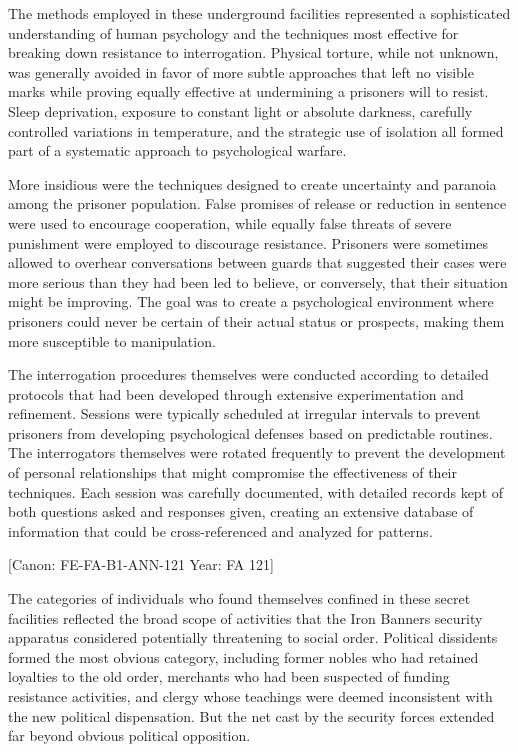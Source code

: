 The methods employed in these underground facilities represented a
sophisticated understanding of human psychology and the techniques most
effective for breaking down resistance to interrogation. Physical
torture, while not unknown, was generally avoided in favor of more
subtle approaches that left no visible marks while proving equally
effective at undermining a prisoner\textquotesingle s will to resist.
Sleep deprivation, exposure to constant light or absolute darkness,
carefully controlled variations in temperature, and the strategic use of
isolation all formed part of a systematic approach to psychological
warfare.

More insidious were the techniques designed to create uncertainty and
paranoia among the prisoner population. False promises of release or
reduction in sentence were used to encourage cooperation, while equally
false threats of severe punishment were employed to discourage
resistance. Prisoners were sometimes allowed to overhear conversations
between guards that suggested their cases were more serious than they
had been led to believe, or conversely, that their situation might be
improving. The goal was to create a psychological environment where
prisoners could never be certain of their actual status or prospects,
making them more susceptible to manipulation.

The interrogation procedures themselves were conducted according to
detailed protocols that had been developed through extensive
experimentation and refinement. Sessions were typically scheduled at
irregular intervals to prevent prisoners from developing psychological
defenses based on predictable routines. The interrogators themselves
were rotated frequently to prevent the development of personal
relationships that might compromise the effectiveness of their
techniques. Each session was carefully documented, with detailed records
kept of both questions asked and responses given, creating an extensive
database of information that could be cross-referenced and analyzed for
patterns.

{[}Canon: FE-FA-B1-ANN-121 \textbar{} Year: FA 121{]}

The categories of individuals who found themselves confined in these
secret facilities reflected the broad scope of activities that the Iron
Banner\textquotesingle s security apparatus considered potentially
threatening to social order. Political dissidents formed the most
obvious category, including former nobles who had retained loyalties to
the old order, merchants who had been suspected of funding resistance
activities, and clergy whose teachings were deemed inconsistent with the
new political dispensation. But the net cast by the security forces
extended far beyond obvious political opposition.


